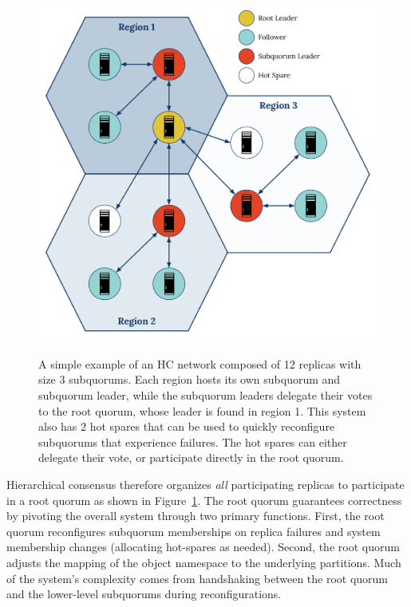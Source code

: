 \begin{figure}
    \begin{center}
        \includegraphics[width=5in]{figures/ch03_hierarchical_topology.pdf}
    \end{center}
    \renewcommand{\baselinestretch}{1}
    \small\normalsize

    \begin{quote}
        \caption[A 12x3 Hierarchical Consensus Network Topology]{A simple example of an HC network composed of 12 replicas with size 3 subquorums. Each region hosts its own subquorum and subquorum leader, while the subquorum leaders delegate their votes to the root quorum, whose leader is found in region 1. This system also has 2 hot spares that can be used to quickly reconfigure subquorums that experience failures. The hot spares can either delegate their vote, or participate directly in the root quorum.}
        \label{fig:ch03_hierarchical_topology}
    \end{quote}
\end{figure}
\renewcommand{\baselinestretch}{2}
\small\normalsize

Hierarchical consensus therefore organizes \emph{all} participating replicas to participate in a root quorum as shown in Figure~\ref{fig:ch03_hierarchical_topology}.
The root quorum guarantees correctness by pivoting the overall system through two primary functions.
First, the root quorum reconfigures subquorum memberships on replica failures and system membership changes (allocating hot-spares as needed).
Second, the root quorum adjusts the mapping of the object namespace to the underlying partitions.
Much of the system's complexity comes from handshaking between the root quorum and the lower-level subquorums during reconfigurations.

